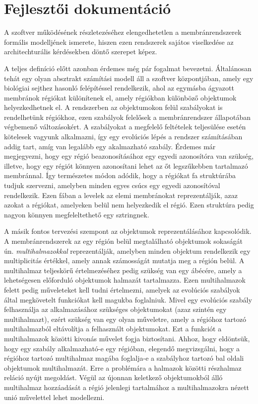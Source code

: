 \chapter{Fejlesztői dokumentáció}
\label{ch:impl}

A szoftver működésének részletezéséhez elengedhetetlen a membránrendszerek formális modelljének ismerete, hiszen ezen rendszerek sajátos viselkedése az architechturális kérdésekben döntő szerepet képez.

A teljes definíció előtt azonban érdemes még pár fogalmat bevezetni. Általánosan tehát egy olyan absztrakt számítási modell áll a szoftver központjában, amely egy biológiai sejthez hasonló felépítéssel rendelkezik, ahol az egymásba ágyazott membránok régiókat különítenek el, amely régiókban különböző objektumok helyezkedhetnek el. A rendszerben az objektumokon felül szabályokat is rendelhetünk régiókhoz, ezen szabályok felelősek a membránrendszer állapotában végbemenő változásokért. A szabályokat a megfelelő feltételek teljesülése esetén kötelesek vagyunk alkalmazni, így egy evolúciós lépés a rendszer számításában addig tart, amíg van legalább egy akalmazható szabály. Érdemes már megjegyezni, hogy egy régió beazonosításához egy egyedi azonosítóra van szükség, illetve, hogy egy régiót könnyen azonosítani lehet az őt legszűkebben tartalmazó membránnal. Így természetes módon adódik, hogy a régiókat fa struktúrába tudjuk szervezni, amelyben minden egyes csúcs egy egyedi azonosítóval rendelkezik. Ezen fában a levelek az elemi membránokat reprezentálják, azaz azokat a régiókat, amelyeken belül nem helyezkedik el régió.  Ezen struktúra pedig nagyon könnyen megfeleltethető egy sztringnek.

A másik fontos tervezési szempont az objektumok reprezentálásához kapcsolódik. A membránrendszerek az egy régión belül megtalálható objektumok sokaságát ún. \textit{multihalmazokkal} reprezentálják, amelyben minden objektum rendelkezik egy multiplicitás értékkel, amely annak számosságát mutatja meg a régión belül. A multihalmaz teljeskörű értelmezéséhez pedig szükség van egy ábécére, amely a lehetségesen előforduló objektumok halmazát tartalmazza. Ezen multihalmazok felett pedig műveleteket kell tudni értelmezni, amelyek az evolúciós szabályok által megkövetelt funkciókat kell magukba foglalniuk. Mivel egy evolúciós szabály felhasználja az alkalmazásához szükséges objektumokat (azaz szintén egy multihalmazt), ezért szükség van egy olyan műveletre, amely a régióhoz tartozó multihalmazból eltávolítja a felhasznált objektumokat. Ezt a funkciót a multihalmazok közötti kivonás művelet fogja biztosítani. Ahhoz, hogy eldöntsük, hogy egy szabály alkalmazható-e egy régióban, elegendő megvizsgálni, hogy a régióhoz tartozó multihalmaz magába foglalja-e a szabályhoz tartozó bal oldali objektumok multihalmazát. Erre a problémára a halmazok közötti részhalmaz reláció nyújt megoldást. Végül az újonnan keletkező objektumokból álló multihalmaz hozzáadását a régió jelenlegi tartalmához a multihalmazokra nézett unió művelettel lehet modellezni. 

